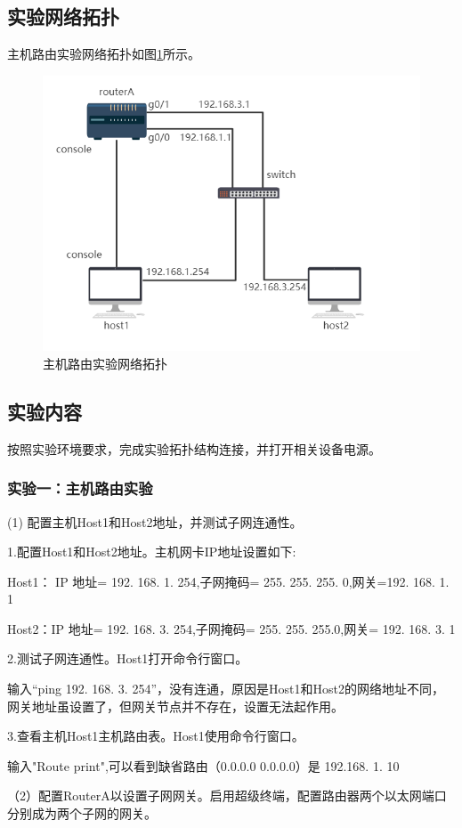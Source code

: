 \documentclass[lang=cn,11pt,a4paper,cite=authoryear]{elegantpaper}
\begin{document}
\subsection{实验网络拓扑}
主机路由实验网络拓扑如图\ref{fig:screenshot014}所示。
\begin{figure}[htbp]
	\centering
	\includegraphics[width=0.7\linewidth]{image/screenshot014}
	\caption{主机路由实验网络拓扑}
	\label{fig:screenshot014}
\end{figure}


\subsection{实验内容}
按照实验环境要求，完成实验拓扑结构连接，并打开相关设备电源。

\subsubsection{实验一：主机路由实验}

(1)	配置主机Host1和Host2地址，并测试子网连通性。

1.配置Host1和Host2地址。主机网卡IP地址设置如下:

Host1： IP 地址= 192. 168. 1. 254,子网掩码= 255. 255. 255. 0,网关=192. 168. 1. 1

Host2：IP 地址= 192. 168. 3. 254,子网掩码= 255. 255. 255.0,网关= 192. 168. 3. 1

2.测试子网连通性。Host1打开命令行窗口。

输入“ping 192. 168. 3. 254”，没有连通，原因是Host1和Host2的网络地址不同，网关地址虽设置了，但网关节点并不存在，设置无法起作用。

3.查看主机Host1主机路由表。Host1使用命令行窗口。

输入"Route print",可以看到缺省路由（0.0.0.0    0.0.0.0）是 192.168. 1. 10

（2）配置RouterA以设置子网网关。启用超级终端，配置路由器两个以太网端口分别成为两个子网的网关。
\end{document}
